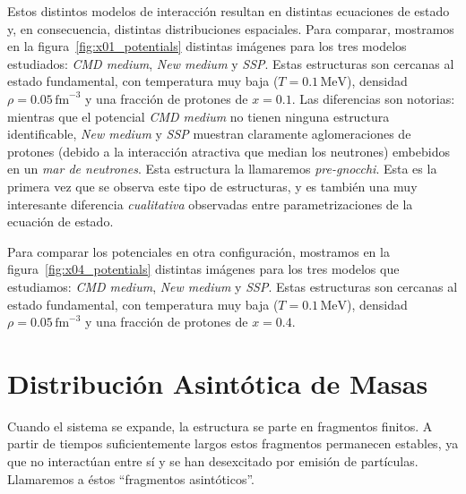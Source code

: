 Estos distintos modelos de interacción resultan en distintas ecuaciones de estado y, en consecuencia, distintas distribuciones espaciales.
Para comparar, mostramos en la figura~\ref{fig:x01_potentials} distintas imágenes para los tres modelos estudiados: \emph{CMD medium}, \emph{New medium} y \emph{SSP}.
Estas estructuras son cercanas al estado fundamental, con temperatura muy baja ($T = 0.1\,\text{MeV}$), densidad $\rho = 0.05\,\text{fm}^{-3}$ y una fracción de protones de $x = 0.1$.
Las diferencias son notorias: mientras que el potencial \emph{CMD medium} no tienen ninguna estructura identificable, \emph{New medium} y \emph{SSP} muestran claramente aglomeraciones de protones (debido a la interacción atractiva que median los neutrones) embebidos en un \emph{mar de neutrones}.
Esta estructura la llamaremos \emph{pre-gnocchi}.
Esta es la primera vez que se observa este tipo de estructuras, y es también una muy interesante diferencia \emph{cualitativa} observadas entre parametrizaciones de la ecuación de estado.

Para comparar los potenciales en otra configuración, mostramos en la figura~\ref{fig:x04_potentials} distintas imágenes para los tres modelos que estudiamos: \emph{CMD medium}, \emph{New medium} y \emph{SSP}.
Estas estructuras son cercanas al estado fundamental, con temperatura muy baja ($T = 0.1\,\text{MeV}$), densidad $\rho = 0.05\,\text{fm}^{-3}$ y una fracción de protones de $x = 0.4$.

\section{Distribución Asintótica de Masas}
Cuando el sistema se expande, la estructura se parte en fragmentos finitos.
A partir de tiempos suficientemente largos estos fragmentos permanecen estables, ya que no interactúan entre sí y se han desexcitado por emisión de partículas.
Llamaremos a éstos ``fragmentos asintóticos''.

